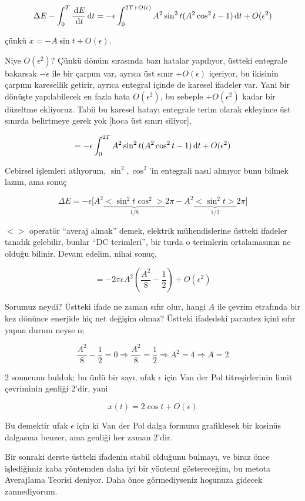 \documentclass[12pt,fleqn]{article}\usepackage{../../common}
\begin{document}
$$
\Delta E - \int_{0}^{T} \frac{\,\mathrm{d} E}{\,\mathrm{d} t} \,\mathrm{d} t =
-\epsilon \int_{0}^{2T +O(\epsilon)} A^2 \sin^2 t(A^2\cos^2 t - 1) \,\mathrm{d} t + O(\epsilon^2)
$$

çünkü $\dot{x} = -A\sin t + O(\epsilon)$. 

Niye $O(\epsilon^2)$? Çünkü dönüm sırasında bazı hatalar yapılıyor, üstteki
entegrale bakarsak $-\epsilon$ ile bir çarpım var, ayrıca üst sınır
$+O(\epsilon)$ içeriyor, bu ikisinin çarpımı karesellik getirir, ayrıca entegral
içinde de karesel ifadeler var. Yani bir dönüşte yapılabilecek en fazla hata
$O(\epsilon^2)$, bu sebeple $+O(\epsilon^2)$ kadar bir düzeltme ekliyoruz. Tabii
bu karesel hatayı entegrale terim olarak ekleyince üst sınırda belirtmeye gerek
yok [hoca üst sınırı siliyor],

$$ = -\epsilon \int_{0}^{2T} A^2 \sin^2 t(A^2\cos^2 t - 1) \,\mathrm{d} t + O(\epsilon^2) $$

Cebirsel işlemleri atlıyorum, $\sin^2, \cos^2$'in entegrali nasıl alınıyor bunu
bilmek lazım, ama sonuç

$$ \Delta E = -\epsilon
\bigg[
A^2 \underbrace{<\sin^2 t \cos^2>}_{1/8} 2\pi - A^2 \underbrace{<\sin^2 t>}_{1/2} 2\pi
\bigg]
$$

$<>$ operatör ``averaj almak'' demek, elektrik mühendislerine üstteki ifadeler
tanıdık gelebilir, bunlar ``DC terimleri'', bir turda o terimlerin ortalamasının
ne olduğu bilinir. Devam edelim, nihai sonuç,

$$ = -2\pi \epsilon A^2 (\frac{A^2}{8}-\frac{1}{2}) + O(\epsilon^2) $$

Sorumuz neydi? Üstteki ifade ne zaman sıfır olur, hangi $A$ ile çevrim etrafında
bir kez dönünce enerjide hiç net değişim olmaz? Üstteki ifadedeki parantez içini
sıfır yapan durum neyse o; 

$$ \frac{A^2}{8}-\frac{1}{2} = 0 \Rightarrow \frac{A^2}{8} = \frac{1}{2}
\Rightarrow A^2 = 4 \Rightarrow A = 2
$$

2 sonucunu bulduk; bu ünlü bir sayı, ufak $\epsilon$ için Van der Pol
titreşirlerinin limit çevriminin genliği 2'dir, yani

$$ x(t) = 2 \cos t + O(\epsilon) $$

Bu demektir ufak $\epsilon$ için ki Van der Pol dalga formunu grafiklesek bir
kosinüs dalgasına benzer, ama genliği her zaman 2'dir.

Bir sonraki derste üstteki ifadenin stabil olduğunu bulmayı, ve biraz önce
işlediğimiz kaba yöntemden daha iyi bir yöntemi göstereceğim, bu metota
Averajlama Teorisi deniyor. Daha önce görmediyseniz hoşunuza gidecek
zannediyorum.
\end{document}
